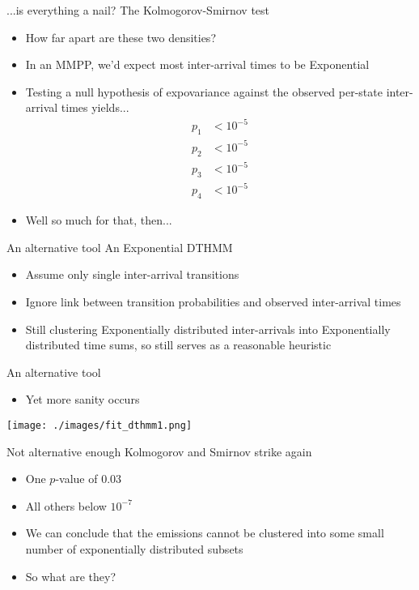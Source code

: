 \documentclass{beamer}
\begin{document}
\begin{frame}{...is everything a nail?}
The Kolmogorov-Smirnov test
\begin{itemize}
\pause \item How far apart are these two densities?
\pause \item In an MMPP, we'd expect most inter-arrival times to be Exponential
\pause \item Testing a null hypothesis of expovariance against the observed per-state inter-arrival times yields...
\pause
\begin{align*}
p_1 &< 10^{-5} \\
p_2 &< 10^{-5} \\
p_3 &< 10^{-5} \\
p_4 &< 10^{-5}
\end{align*}
\pause \item Well so much for that, then...
\end{itemize}
\end{frame}

\begin{frame}{An alternative tool}
An Exponential DTHMM
\begin{itemize}
\pause \item Assume only single inter-arrival transitions
\pause \item Ignore link between transition probabilities and observed inter-arrival times
\pause \item Still clustering Exponentially distributed inter-arrivals into Exponentially distributed time sums, so still serves as a reasonable heuristic
\end{itemize}
\end{frame}

\begin{frame}{An alternative tool}
\begin{itemize}
\item Yet more sanity occurs
\end{itemize}
\texttt{[image: ./images/fit\_dthmm1.png]}
\end{frame}

\begin{frame}{Not alternative enough}
Kolmogorov and Smirnov strike again
\begin{itemize}
\pause \item One $p$-value of 0.03
\pause \item All others below $10^{-7}$
\pause \item We can conclude that the emissions cannot be clustered into some small number of exponentially distributed subsets
\pause \item So what are they?
\end{itemize}
\end{frame}
\end{document}
